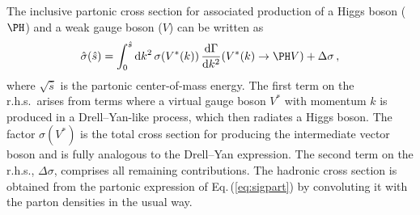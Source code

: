 The inclusive partonic cross section for associated production of a
Higgs boson ($\PH$) and a weak gauge boson ($V$) can be written as
\begin{equation}
\begin{split}
\hat \sigma(\hat s) = \int_0^{\hat s} {\rm d}k^2 \,
\sigma(V^\ast(k))\,\frac{{\rm d}\Gamma}{{\rm d}k^2} (V^\ast(k)\to \PH V) +
\Delta\sigma\,,
\label{eq:sigpart}
\end{split}
\end{equation}
where $\sqrt{\hat s}$ is the partonic center-of-mass energy.
The first term on the r.h.s.\ arises from terms where a virtual gauge
boson $V^\ast$ with momentum $k$ is produced in a Drell--Yan-like
process, which then radiates a Higgs boson. The factor $\sigma(V^\ast)$
is the total cross section for producing the intermediate vector boson
and is fully analogous to the Drell--Yan expression. The second term on
the r.h.s., $\Delta\sigma$, comprises all remaining contributions.
The hadronic cross section is obtained from the partonic expression of
Eq.\,(\ref{eq:sigpart}) by convoluting it with the parton densities in
the usual way.

